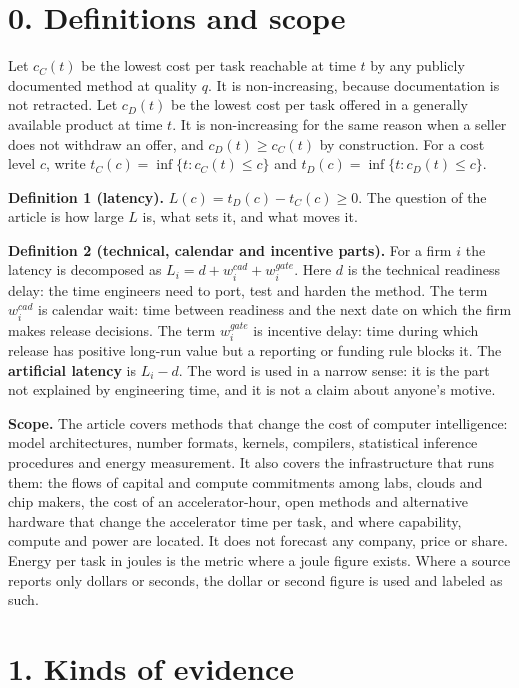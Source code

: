 \documentclass[10pt,letterpaper]{article}
\begin{document}
\section{0. Definitions and scope}\label{definitions-and-scope}

Let \(c_C(t)\) be the lowest cost per task reachable at time \(t\) by
any publicly documented method at quality \(q\). It is non-increasing,
because documentation is not retracted. Let \(c_D(t)\) be the lowest
cost per task offered in a generally available product at time \(t\). It
is non-increasing for the same reason when a seller does not withdraw an
offer, and \(c_D(t) \ge c_C(t)\) by construction. For a cost level
\(c\), write \(t_C(c) = \inf\{t : c_C(t) \le c\}\) and
\(t_D(c) = \inf\{t : c_D(t) \le c\}\).

\textbf{Definition 1 (latency).} \(L(c) = t_D(c) - t_C(c) \ge 0\). The
question of the article is how large \(L\) is, what sets it, and what
moves it.

\textbf{Definition 2 (technical, calendar and incentive parts).} For a
firm \(i\) the latency is decomposed as
\(L_i = d + w^{cad}_i + w^{gate}_i\). Here \(d\) is the technical
readiness delay: the time engineers need to port, test and harden the
method. The term \(w^{cad}_i\) is calendar wait: time between readiness
and the next date on which the firm makes release decisions. The term
\(w^{gate}_i\) is incentive delay: time during which release has
positive long-run value but a reporting or funding rule blocks it. The
\textbf{artificial latency} is \(L_i - d\). The word is used in a narrow
sense: it is the part not explained by engineering time, and it is not a
claim about anyone's motive.

\textbf{Scope.} The article covers methods that change the cost of
computer intelligence: model architectures, number formats, kernels,
compilers, statistical inference procedures and energy measurement. It
also covers the infrastructure that runs them: the flows of capital and
compute commitments among labs, clouds and chip makers, the cost of an
accelerator-hour, open methods and alternative hardware that change the
accelerator time per task, and where capability, compute and power are
located. It does not forecast any company, price or share. Energy per
task in joules is the metric where a joule figure exists. Where a source
reports only dollars or seconds, the dollar or second figure is used and
labeled as such.

\section{1. Kinds of evidence}\label{kinds-of-evidence}
\end{document}
